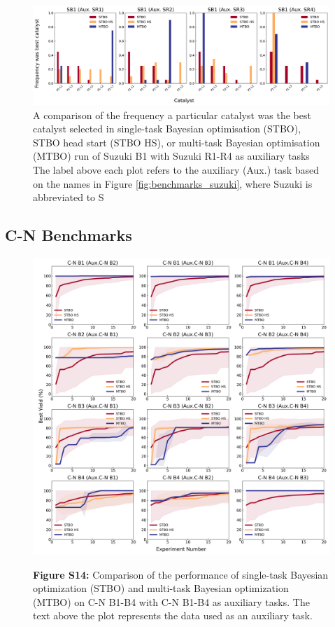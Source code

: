 \begin{figure}
    \centering
    \includegraphics[width=\textwidth]{gfx/Chapter04/baumgartner_suzuki_reizman_suzuki_one_cotraining_optimization_catalyst_best.png}
    \caption{A comparison of the frequency a particular catalyst was the best catalyst selected in single-task Bayesian optimisation (STBO), STBO head start (STBO HS), or multi-task Bayesian optimisation (MTBO) run of Suzuki B1 with Suzuki R1-R4 as auxiliary tasks The label above each plot refers to the auxiliary (Aux.) task based on the names in Figure \ref{fig:benchmarks_suzuki}, where Suzuki is abbreviated to S}
    \label{fig:best_selected_catalyst}
\end{figure}


\subsection{C-N Benchmarks}

\begin{figure}
\caption{\textbf{Figure S14:} Comparison of the performance of single-task Bayesian optimization (STBO) and multi-task Bayesian optimization (MTBO) on C-N B1-B4 with C-N B1-B4 as auxiliary tasks. The text above the plot represents the data used as an auxiliary task.}\includegraphics[width=1\textwidth]{gfx/Appendix/baumgartner_cn_baumgartner_cn_one_cotraining_optimization.png}
\label{fig:13}
\end{figure}

